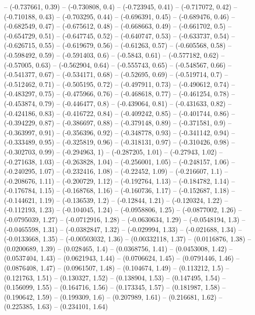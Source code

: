 -- (-0.737661, 0.39)
-- (-0.730808, 0.4)
-- (-0.723945, 0.41)
-- (-0.717072, 0.42)
-- (-0.710188, 0.43)
-- (-0.703295, 0.44)
-- (-0.696391, 0.45)
-- (-0.689476, 0.46)
-- (-0.682549, 0.47)
-- (-0.675612, 0.48)
-- (-0.668663, 0.49)
-- (-0.661702, 0.5)
-- (-0.654729, 0.51)
-- (-0.647745, 0.52)
-- (-0.640747, 0.53)
-- (-0.633737, 0.54)
-- (-0.626715, 0.55)
-- (-0.619679, 0.56)
-- (-0.61263, 0.57)
-- (-0.605568, 0.58)
-- (-0.598492, 0.59)
-- (-0.591403, 0.6)
-- (-0.5843, 0.61)
-- (-0.577182, 0.62)
-- (-0.57005, 0.63)
-- (-0.562904, 0.64)
-- (-0.555743, 0.65)
-- (-0.548567, 0.66)
-- (-0.541377, 0.67)
-- (-0.534171, 0.68)
-- (-0.52695, 0.69)
-- (-0.519714, 0.7)
-- (-0.512462, 0.71)
-- (-0.505195, 0.72)
-- (-0.497911, 0.73)
-- (-0.490612, 0.74)
-- (-0.483297, 0.75)
-- (-0.475966, 0.76)
-- (-0.468618, 0.77)
-- (-0.461254, 0.78)
-- (-0.453874, 0.79)
-- (-0.446477, 0.8)
-- (-0.439064, 0.81)
-- (-0.431633, 0.82)
-- (-0.424186, 0.83)
-- (-0.416722, 0.84)
-- (-0.409242, 0.85)
-- (-0.401744, 0.86)
-- (-0.394229, 0.87)
-- (-0.386697, 0.88)
-- (-0.379148, 0.89)
-- (-0.371581, 0.9)
-- (-0.363997, 0.91)
-- (-0.356396, 0.92)
-- (-0.348778, 0.93)
-- (-0.341142, 0.94)
-- (-0.333489, 0.95)
-- (-0.325819, 0.96)
-- (-0.318131, 0.97)
-- (-0.310426, 0.98)
-- (-0.302703, 0.99)
-- (-0.294963, 1)
-- (-0.287205, 1.01)
-- (-0.27943, 1.02)
-- (-0.271638, 1.03)
-- (-0.263828, 1.04)
-- (-0.256001, 1.05)
-- (-0.248157, 1.06)
-- (-0.240295, 1.07)
-- (-0.232416, 1.08)
-- (-0.22452, 1.09)
-- (-0.216607, 1.1)
-- (-0.208676, 1.11)
-- (-0.200729, 1.12)
-- (-0.192764, 1.13)
-- (-0.184782, 1.14)
-- (-0.176784, 1.15)
-- (-0.168768, 1.16)
-- (-0.160736, 1.17)
-- (-0.152687, 1.18)
-- (-0.144621, 1.19)
-- (-0.136539, 1.2)
-- (-0.12844, 1.21)
-- (-0.120324, 1.22)
-- (-0.112193, 1.23)
-- (-0.104045, 1.24)
-- (-0.0958806, 1.25)
-- (-0.0877002, 1.26)
-- (-0.0795039, 1.27)
-- (-0.0712916, 1.28)
-- (-0.0630634, 1.29)
-- (-0.0548194, 1.3)
-- (-0.0465598, 1.31)
-- (-0.0382847, 1.32)
-- (-0.029994, 1.33)
-- (-0.021688, 1.34)
-- (-0.0133668, 1.35)
-- (-0.00503032, 1.36)
-- (0.00332118, 1.37)
-- (0.0116876, 1.38)
-- (0.0200689, 1.39)
-- (0.028465, 1.4)
-- (0.0368756, 1.41)
-- (0.0453008, 1.42)
-- (0.0537404, 1.43)
-- (0.0621943, 1.44)
-- (0.0706624, 1.45)
-- (0.0791446, 1.46)
-- (0.0876408, 1.47)
-- (0.0961507, 1.48)
-- (0.104674, 1.49)
-- (0.113212, 1.5)
-- (0.121763, 1.51)
-- (0.130327, 1.52)
-- (0.138904, 1.53)
-- (0.147495, 1.54)
-- (0.156099, 1.55)
-- (0.164716, 1.56)
-- (0.173345, 1.57)
-- (0.181987, 1.58)
-- (0.190642, 1.59)
-- (0.199309, 1.6)
-- (0.207989, 1.61)
-- (0.216681, 1.62)
-- (0.225385, 1.63)
-- (0.234101, 1.64)
